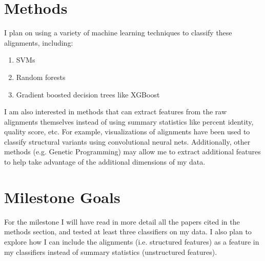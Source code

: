 \documentclass{article}
\begin{document}
\section*{Methods}
I plan on using a variety of machine learning techniques to classify these alignments, including: 
\begin{enumerate}
    \item SVMs \parencite{Hastie2008}
    \item Random forests \parencite{Ho1995, Breiman2001}
    \item Gradient boosted decision trees like XGBoost \parencite{Chen2016b} 
\end{enumerate}
I am also interested in methods that can extract features from the raw alignments themselves instead of using summary statistics like percent identity, quality score, etc. For example, visualizations of alignments have been used to classify structural variants using convolutional neural nets. Additionally, other methods (e.g. Genetic Programming) may allow me to extract additional features \parencite{Ahmed2014} to help take advantage of the additional dimensions of my data. 
 
\section*{Milestone Goals}
For the milestone I will have read in more detail all the papers cited in the methods section, and tested at least three classifiers on my data. I also plan to explore how I can include the alignments (i.e. structured features) as a feature in my classifiers instead of summary statistics (unstructured features). 

\printbibliography 
\end{document}
